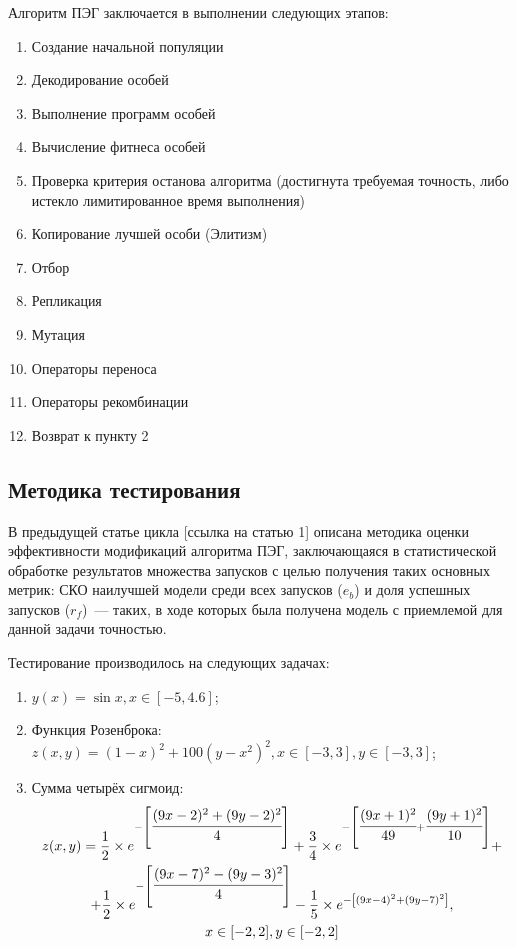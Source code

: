 Алгоритм ПЭГ заключается в выполнении следующих этапов:
\begin{enumerate} \itemsep0pt \parskip0pt 
  \item Создание начальной популяции
  \item Декодирование особей
  \item Выполнение программ особей
  \item Вычисление фитнеса особей
  \item Проверка критерия останова алгоритма (достигнута требуемая точность, либо истекло лимитированное время выполнения)
  \item Копирование лучшей особи (Элитизм)
  \item Отбор
  \item Репликация
  \item Мутация
  \item Операторы переноса
  \item Операторы рекомбинации
  \item Возврат к пункту 2
\end{enumerate}




\subsection{Методика тестирования}

В предыдущей статье цикла [ссылка на статью 1] описана методика оценки эффективности модификаций алгоритма ПЭГ, заключающаяся в статистической обработке результатов множества запусков с целью получения таких основных метрик: СКО наилучшей модели среди всех запусков ($e_{b}$) и доля успешных запусков ($r_{f}$)~--- таких, в ходе которых была получена модель с приемлемой для данной задачи точностью.

Тестирование производилось на следующих задачах:
\begin{enumerate}
  \item $y(x) = \sin x, x \in [-5, 4.6]$;
  \item Функция Розенброка: $z(x, y) = {(1 - x)}^2 + 100 {(y - x^2)}^2, x \in [-3, 3], y \in [-3, 3]$;
  \item Сумма четырёх сигмоид:
    \begin{multline}
      z(x, y) = \frac{1}{2} \times e^{-\left\lbrack\cfrac{(9x-2)^2 + (9y-2)^2}{4}\right\rbrack} + \frac{3}{4} \times e^{-\left\lbrack\cfrac{(9x+1)^2}{49} + \cfrac{(9y+1)^2}{10}\right\rbrack} + \\
      + \frac{1}{2} \times e^{-\left\lbrack\cfrac{(9x-7)^2 - (9y-3)^2}{4}\right\rbrack} -\frac{1}{5} \times e^{-\left\lbrack(9x-4)^2 + (9y-7)^2\right\rbrack}, \\
      x \in [-2, 2], y \in [-2, 2]
    \end{multline}
\end{enumerate}



